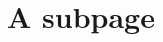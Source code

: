 \chapter{A subpage}
\label{\detokenize{subfolder/asubpage:a-subpage}}\label{\detokenize{subfolder/asubpage::doc}}






\renewcommand{\indexname}{Index}
\printindex
